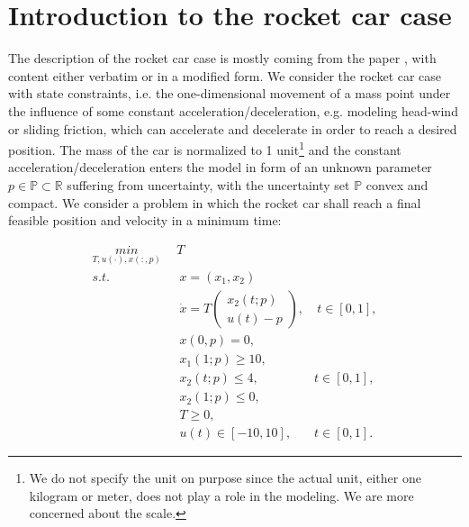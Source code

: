 \documentclass  [
  paper    = a4,
  BCOR     = 10mm,
  twoside,
  fontsize = 12pt,
  fleqn,
  toc      = bibnumbered,
  toc      = listofnumbered,
  numbers  = noendperiod,
  headings = normal,
  listof   = leveldown,
  version  = 3.03
]                                       {scrreprt}
\newcommand{\<}{\langle}
\renewcommand{\>}{\rangle}
\begin{document}
\section{Introduction to the rocket car case}

The description of the rocket car case is mostly coming from the paper \cite{MatSch22}, with content either verbatim or in a modified form. We consider the rocket car case with state constraints, i.e. the one-dimensional movement of a mass point under the influence of some constant acceleration/deceleration, e.g. modeling head-wind or sliding friction, which can accelerate and decelerate in order to reach a desired position. The mass of the car is normalized to 1 unit\footnote{We do not specify the unit on purpose since the actual unit, either one kilogram or meter, does not play a role in the modeling. We are more concerned about the scale.} and the constant acceleration/deceleration enters the model in form of an unknown parameter $p \in  \mathbb{P} \subset \mathbb{R}$ suffering from uncertainty, with the uncertainty set $ \mathbb{P}$ convex and compact. We consider a problem in which the rocket car shall reach a final feasible position and velocity in a minimum time: 



\begin{subequations}
	\begin{align}
		\underset{T, u(\cdot), x(:,p)}{min} \   & \  T \\ 
		s.t.  & \ \ x = (x_1, x_2)   \label{rc_x} \\ 
		& \ \  \dot{x} = T  \begin{pmatrix}  x_2(t;p) \\ u(t)-p   \end{pmatrix}, & \ t \in [0,1],  \label{rc_partial} \\
		& \ \ x(0,p) = 0, \label{rc_t0}\\
		& \ \ x_1(1;p) \geq 10, \label{rc_x1_t1} \\
		& \ \ x_2(t;p) \leq 4, & t \in [0,1], \label{rc_x2_tc} \\
		& \ \ x_2(1;p) \leq 0, \label{rc_x2_T}  \\
		& \ \ T \geq 0, \\
		& \ \ u(t) \in [-10, 10], & t \in [0,1]. 
	\end{align}
	\label{rc}
\end{subequations}
\end{document}
